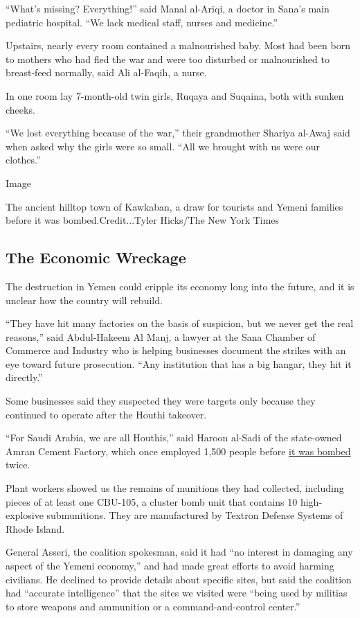 ``What's missing? Everything!'' said Manal al-Ariqi, a doctor in Sana's
main pediatric hospital. ``We lack medical staff, nurses and medicine.''

Upstairs, nearly every room contained a malnourished baby. Most had been
born to mothers who had fled the war and were too disturbed or
malnourished to breast-feed normally, said Ali al-Faqih, a nurse.

In one room lay 7-month-old twin girls, Ruqaya and Suqaina, both with
sunken cheeks.

``We lost everything because of the war,'' their grandmother Shariya
al-Awaj said when asked why the girls were so small. ``All we brought
with us were our clothes.''

Image

The ancient hilltop town of Kawkaban, a draw for tourists and Yemeni
families before it was bombed.Credit...Tyler Hicks/The New York Times

\hypertarget{the-economic-wreckage}{%
\subsection{The Economic Wreckage}\label{the-economic-wreckage}}

The destruction in Yemen could cripple its economy long into the future,
and it is unclear how the country will rebuild.

``They have hit many factories on the basis of suspicion, but we never
get the real reasons,'' said Abdul-Hakeem Al Manj, a lawyer at the Sana
Chamber of Commerce and Industry who is helping businesses document the
strikes with an eye toward future prosecution. ``Any institution that
has a big hangar, they hit it directly.''

Some businesses said they suspected they were targets only because they
continued to operate after the Houthi takeover.

``For Saudi Arabia, we are all Houthis,'' said Haroon al-Sadi of the
state-owned Amran Cement Factory, which once employed 1,500 people
before
\href{http://www.nytimes.com/2016/02/04/world/middleeast/yemen-bombing-coalition-civilians.html}{it
was bombed} twice.

Plant workers showed us the remains of munitions they had collected,
including pieces of at least one CBU-105, a cluster bomb unit that
contains 10 high-explosive submunitions. They are manufactured by
Textron Defense Systems of Rhode Island.

General Asseri, the coalition spokesman, said it had ``no interest in
damaging any aspect of the Yemeni economy,'' and had made great efforts
to avoid harming civilians. He declined to provide details about
specific sites, but said the coalition had ``accurate intelligence''
that the sites we visited were ``being used by militias to store weapons
and ammunition or a command-and-control center.''

